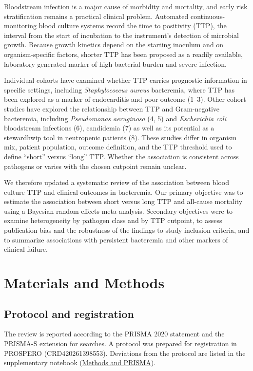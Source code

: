 \documentclass[
  11pt,
]{article}
\begin{document}
Bloodstream infection is a major cause of morbidity and mortality, and
early risk stratification remains a practical clinical problem.
Automated continuous-monitoring blood culture systems record the time to
positivity (TTP), the interval from the start of incubation to the
instrument's detection of microbial growth. Because growth kinetics
depend on the starting inoculum and on organism-specific factors,
shorter TTP has been proposed as a readily available,
laboratory-generated marker of high bacterial burden and severe
infection.

Individual cohorts have examined whether TTP carries prognostic
information in specific settings, including \emph{Staphylococcus aureus}
bacteremia, where TTP has been explored as a marker of endocarditis and
poor outcome (1--3). Other cohort studies have explored the relationship
between TTP and Gram-negative bacteremia, including \emph{Pseudomonas
aeruginosa} (4, 5) and \emph{Escherichia coli} bloodstream infections
(6), candidemia (7) as well as its potential as a stewardhwip tool in
neutropenic patients (8). These studies differ in organism mix, patient
population, outcome definition, and the TTP threshold used to define
``short'' versus ``long'' TTP. Whether the association is consistent
across pathogens or varies with the chosen cutpoint remain unclear.

We therefore updated a systematic review of the association between
blood culture TTP and clinical outcomes in bacteremia. Our primary
objective was to estimate the association between short versus long TTP
and all-cause mortality using a Bayesian random-effects meta-analysis.
Secondary objectives were to examine heterogeneity by pathogen class and
by TTP cutpoint, to assess publication bias and the robustness of the
findings to study inclusion criteria, and to summarize associations with
persistent bacteremia and other markers of clinical failure.

\section{Materials and Methods}\label{materials-and-methods}

\subsection{Protocol and registration}\label{protocol-and-registration}

The review is reported according to the PRISMA 2020 statement and the
PRISMA-S extension for searches. A protocol was prepared for
registration in PROSPERO (CRD420261398553). Deviations from the protocol
are listed in the supplementary notebook
(\href{notebooks/methods.qmd}{Methods and PRISMA}).
\end{document}

